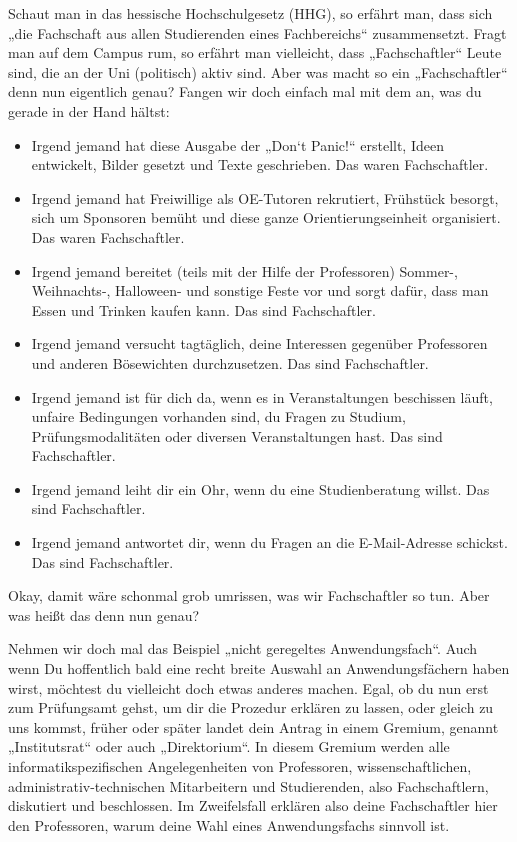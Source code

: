 Schaut man in das hessische Hochschulgesetz (HHG), so erfährt man, dass sich „die Fachschaft aus allen Studierenden eines Fachbereichs“ zusammensetzt. Fragt man auf dem Campus rum, so erfährt man vielleicht, dass „Fachschaftler“ Leute sind, die an der Uni (politisch) aktiv sind. Aber was macht so ein „Fachschaftler“ denn nun eigentlich genau? Fangen wir doch einfach mal mit dem an, was du gerade in der Hand hältst:

\begin{itemize}
 \item Irgend jemand hat diese Ausgabe der „Don‘t Panic!“ erstellt, Ideen entwickelt, Bilder gesetzt und Texte geschrieben. Das waren Fachschaftler.

 \item Irgend jemand hat Freiwillige als OE-Tutoren rekrutiert, Frühstück besorgt, sich um Sponsoren bemüht und diese ganze Orientierungseinheit organisiert. Das waren Fachschaftler.
 
 \item Irgend jemand bereitet (teils mit der Hilfe der Professoren) Sommer-, Weihnachts-, Halloween- und sonstige Feste vor und sorgt dafür, dass man Essen und Trinken kaufen kann. Das sind Fachschaftler.

 \item Irgend jemand versucht tagtäglich, deine Interessen gegenüber Professoren und anderen Bösewichten durchzusetzen. Das sind Fachschaftler.

 \item Irgend jemand ist für dich da, wenn es in Veranstaltungen beschissen läuft, unfaire Bedingungen vorhanden sind, du Fragen zu Studium, Prüfungsmodalitäten oder diversen Veranstaltungen hast. Das sind Fachschaftler.

 \item Irgend jemand leiht dir ein Ohr, wenn du eine Studienberatung willst. Das sind Fachschaftler.

 \item Irgend jemand antwortet dir, wenn du Fragen an die E-Mail-Adresse \emailfachschaft schickst. Das sind Fachschaftler.
\end{itemize}

Okay, damit wäre schonmal grob umrissen, was wir Fachschaftler so tun. Aber was heißt das denn nun genau?


Nehmen wir doch mal das Beispiel „nicht geregeltes Anwendungsfach“. Auch wenn Du hoffentlich bald eine recht breite Auswahl an Anwendungsfächern haben wirst, möchtest du vielleicht doch etwas anderes machen. Egal, ob du nun erst zum Prüfungsamt gehst, um dir die Prozedur erklären zu lassen, oder gleich zu uns kommst, früher oder später landet dein Antrag in einem Gremium, genannt „Institutsrat“ oder auch „Direktorium“. In diesem Gremium werden alle informatikspezifischen Angelegenheiten von Professoren, wissenschaftlichen, administrativ-technischen Mitarbeitern und Studierenden, also Fachschaftlern, diskutiert und beschlossen. Im Zweifelsfall erklären also deine Fachschaftler hier den Professoren, warum deine Wahl eines Anwendungsfachs sinnvoll ist.


